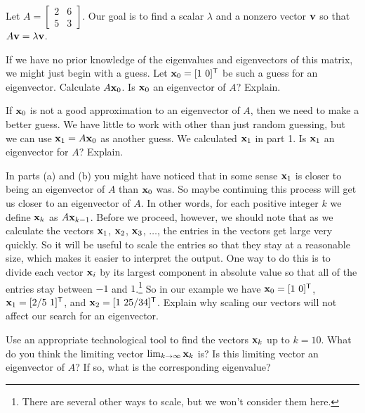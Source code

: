 \begin{pa} \label{pa:4_d} Let $A = \left[ \begin{array}{cc} 2&6 \\ 5&3 \end{array} \right]$. Our goal is to find a scalar $\lambda$ and a nonzero vector $\mathbf{v}$ so that $A \mathbf{v} = \lambda \mathbf{v}$. 
\be
\item If we have no prior knowledge of the eigenvalues and eigenvectors of this matrix, we might just begin with a guess. Let $\mathbf{x}_0 = [1 \ 0]^{\mathsf{T}}$ be such a guess for an eigenvector.  Calculate $A \mathbf{x}_0$. Is $\mathbf{x}_0$ an eigenvector of $A$? Explain.


	\item If $\mathbf{x}_0$ is not a good approximation to an eigenvector of $A$, then we need to make a better guess. We have little to work with other than just random guessing, but we can use $\mathbf{x}_1 = A\mathbf{x}_0$ as another guess. We calculated $\mathbf{x}_1$ in part 1. Is $\mathbf{x}_1$ an eigenvector for $A$? Explain.

\item In parts (a) and (b) you might have noticed that in some sense $\mathbf{x}_1$ is closer to being an eigenvector of $A$ than $\mathbf{x}_0$ was. So maybe continuing this process will get us closer to an eigenvector of $A$. In other words, for each positive integer $k$ we define $\mathbf{x}_k$ as $A \mathbf{x}_{k-1}$. Before we proceed, however, we should note that as we calculate the vectors $\mathbf{x}_1$, $\mathbf{x}_2$, $\mathbf{x}_3$, $\ldots$, the entries in the vectors get large very quickly. So it will be useful to scale the entries so that they stay at a reasonable size, which makes it easier to interpret the output. One way to do this is to divide each vector $\mathbf{x}_i$ by its largest component in absolute value so that all of the entries stay between $-1$ and $1$.\footnote{There are several other ways to scale, but we won't consider them here.} So in our example we have $\mathbf{x}_0 = [1 \ 0]^{\mathsf{T}}$, $\mathbf{x}_1 = [2/5 \ 1]^{\mathsf{T}}$, and $\mathbf{x}_2 = [1 \ 25/34]^{\mathsf{T}}$. Explain why scaling our vectors will not affect our search for an eigenvector.


\item Use an appropriate technological tool to find the vectors $\mathbf{x}_k$ up to $k=10$. What do you think the limiting vector $\lim_{k \to \infty} \mathbf{x}_k$ is? Is this limiting vector an eigenvector of $A$? If so, what is the corresponding eigenvalue?  

\ee

\end{pa}


